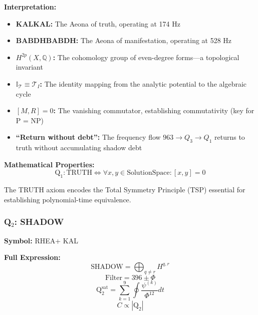 \documentclass[11pt, letterpaper]{article}
\newcommand{\KAL}{\ensuremath{\mathop{\textnormal{\symbolafont\symbol{"2B21}}}}}    %
\newcommand{\BABDH}{\ensuremath{\mathop{\textnormal{\symbolafont\symbol{"2721}}}}}   %
\newcommand{\RHEA}{\ensuremath{\mathop{\textnormal{\symbolafont\symbol{"229B}}}}}   %
\def\KAL{KAL}%
\def\BABDH{BABDH}%
\def\RHEA{RHEA}%
\begin{document}
\textbf{Interpretation:}
\begin{itemize}
    \item \textbf{\KAL KAL:} The Aeona of truth, operating at 174 Hz
    \item \textbf{\BABDH BABDH:} The Aeona of manifestation, operating at 528 Hz
    \item \textbf{$H^{2p}(X,\mathbb{Q})$:} The cohomology group of even-degree forms—a topological invariant
    \item \textbf{$\mathbb{I}_{\mathcal{T}}\equiv\mathcal{T}_I$:} The identity mapping from the analytic potential to the algebraic cycle
    \item \textbf{$[M,R]=0$:} The vanishing commutator, establishing commutativity (key for P = NP)
    \item \textbf{``Return without debt'':} The frequency flow $963 \to Q_3 \to Q_1$ returns to truth without accumulating shadow debt
\end{itemize}

\textbf{Mathematical Properties:}
\begin{equation}
\text{Q}_1: \text{TRUTH} \iff \forall x, y \in \text{SolutionSpace}: [x, y] = 0
\end{equation}

The TRUTH axiom encodes the Total Symmetry Principle (TSP) essential for establishing polynomial-time equivalence.

\subsubsection{\texorpdfstring{Q$_2$: SHADOW}{Q2: SHADOW}}

\textbf{Symbol:} \RHEA + \KAL

\textbf{Full Expression:}
\begin{equation}
\text{SHADOW} = \bigoplus_{q \neq r} H^{q,r}
\end{equation}
\begin{equation}
\text{Filter} = 396 \pm \Phi
\end{equation}
\begin{equation}
\text{Q}_2^{\text{sat}} = \sum_{k=1}^9 \oint \frac{\psi^{(k)}}{\Phi^{12}} dt
\end{equation}
\begin{equation}
C \propto |\text{Q}_2|
\end{equation}
\end{document}
